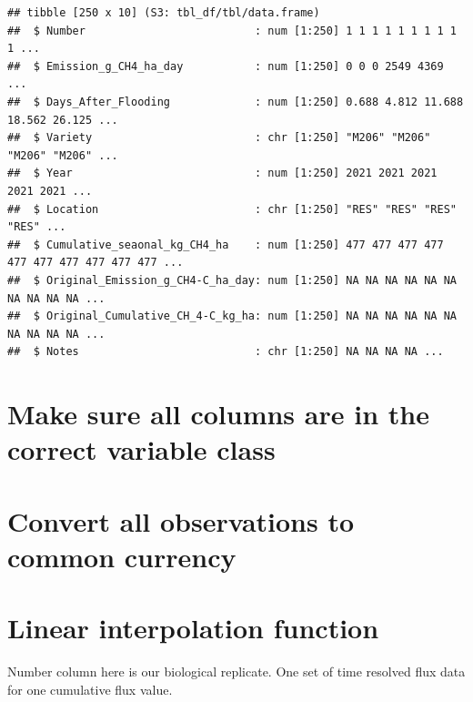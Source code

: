 \documentclass[
]{article}
\newenvironment{Shaded}{\begin{snugshade}}{\end{snugshade}}
\newcommand{\FunctionTok}[1]{\textcolor[rgb]{0.13,0.29,0.53}{\textbf{#1}}}
\newcommand{\NormalTok}[1]{#1}
\newcommand{\OtherTok}[1]{\textcolor[rgb]{0.56,0.35,0.01}{#1}}
\newcommand{\SpecialCharTok}[1]{\textcolor[rgb]{0.81,0.36,0.00}{\textbf{#1}}}
\begin{document}
\begin{verbatim}
## tibble [250 x 10] (S3: tbl_df/tbl/data.frame)
##  $ Number                          : num [1:250] 1 1 1 1 1 1 1 1 1 1 ...
##  $ Emission_g_CH4_ha_day           : num [1:250] 0 0 0 2549 4369 ...
##  $ Days_After_Flooding             : num [1:250] 0.688 4.812 11.688 18.562 26.125 ...
##  $ Variety                         : chr [1:250] "M206" "M206" "M206" "M206" ...
##  $ Year                            : num [1:250] 2021 2021 2021 2021 2021 ...
##  $ Location                        : chr [1:250] "RES" "RES" "RES" "RES" ...
##  $ Cumulative_seaonal_kg_CH4_ha    : num [1:250] 477 477 477 477 477 477 477 477 477 477 ...
##  $ Original_Emission_g_CH4-C_ha_day: num [1:250] NA NA NA NA NA NA NA NA NA NA ...
##  $ Original_Cumulative_CH_4-C_kg_ha: num [1:250] NA NA NA NA NA NA NA NA NA NA ...
##  $ Notes                           : chr [1:250] NA NA NA NA ...
\end{verbatim}

\section{Make sure all columns are in the correct variable
class}\label{make-sure-all-columns-are-in-the-correct-variable-class}

\begin{Shaded}
\end{Shaded}

\section{Convert all observations to common
currency}\label{convert-all-observations-to-common-currency}

\section{Linear interpolation
function}\label{linear-interpolation-function}

Number column here is our biological replicate. One set of time resolved
flux data for one cumulative flux value.
\end{document}
